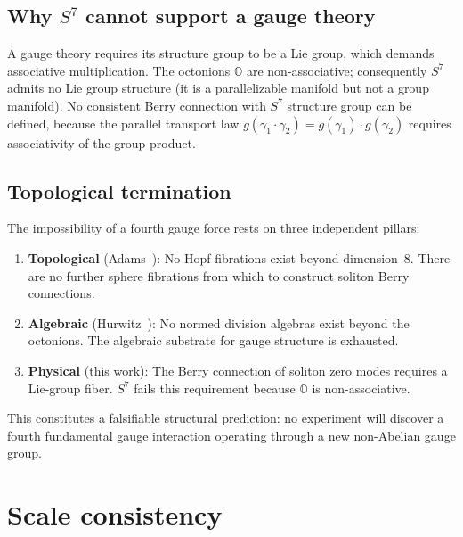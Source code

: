 \documentclass[a4paper,12pt]{article}
\begin{document}
\subsection{Why $S^7$ cannot support a gauge theory}

A gauge theory requires its structure group to be a Lie group, which
demands associative multiplication. The octonions $\mathbb{O}$ are
non-associative; consequently $S^7$ admits no Lie group structure
(it is a parallelizable manifold but not a group manifold).
No consistent Berry connection with $S^7$ structure group can be
defined, because the parallel transport law
$g(\gamma_1 \cdot \gamma_2) = g(\gamma_1)\cdot g(\gamma_2)$
requires associativity of the group product.

\subsection{Topological termination}

The impossibility of a fourth gauge force rests on three independent
pillars:
\begin{enumerate}
 \item \textbf{Topological} (Adams~\cite{Adams1960}): No Hopf
 fibrations exist beyond dimension~8. There are no further
 sphere fibrations from which to construct soliton Berry
 connections.
 \item \textbf{Algebraic} (Hurwitz~\cite{Hurwitz1898}): No normed
 division algebras exist beyond the octonions. The algebraic
 substrate for gauge structure is exhausted.
 \item \textbf{Physical} (this work): The Berry connection of
 soliton zero modes requires a Lie-group fiber. $S^7$ fails
 this requirement because $\mathbb{O}$ is non-associative.
\end{enumerate}

\begin{center}
\end{center}

This constitutes a falsifiable structural prediction: no experiment
will discover a fourth fundamental gauge interaction operating through
a new non-Abelian gauge group.


\section{Scale consistency}
\label{sec:scales}
\end{document}
